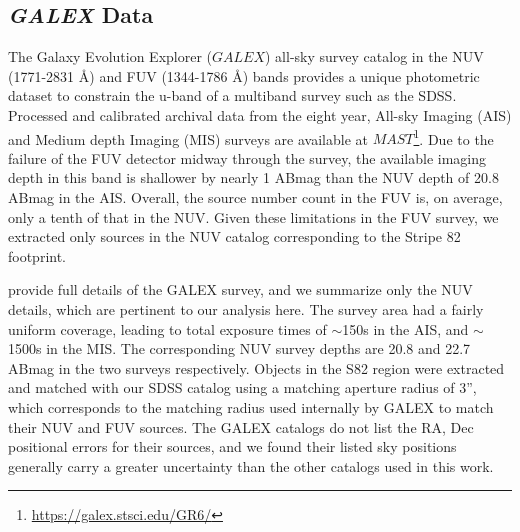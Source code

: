 \documentclass{aastex63}
\begin{document}
 



        

\subsection{{\it GALEX} Data} \label{ssec:galex}

The Galaxy Evolution Explorer ($GALEX$) all-sky survey catalog in the NUV (1771-2831 \AA) and FUV (1344-1786 \AA) bands provides a unique photometric dataset to constrain the u-band of a multiband survey such as the SDSS. Processed and calibrated archival data from the eight year, All-sky Imaging (AIS) and Medium depth Imaging (MIS) surveys are available at $MAST$\footnote{\url{https://galex.stsci.edu/GR6/}}. Due to the failure of the FUV detector midway through the survey, the available imaging depth in this band is shallower by nearly 1 ABmag than the NUV depth of 20.8 ABmag in the AIS. Overall, the source number count in the FUV is, on average, only a tenth of that in the NUV. Given these limitations in the FUV survey, we extracted only sources in the NUV catalog corresponding to the Stripe 82 footprint.  
 
\citet{2017ApJS..230...24B} provide full details of the GALEX survey, and we summarize only the NUV details, which are pertinent to our analysis here. The survey area had a fairly uniform coverage, leading to total exposure times of $\sim$150s in the AIS, and $\sim$1500s in the MIS. The corresponding NUV survey depths are 20.8 and 22.7 ABmag in the two surveys respectively. Objects in the S82 region were extracted and matched with our SDSS catalog using a matching aperture radius of 3'', which corresponds to the matching radius used internally by GALEX to match their NUV and FUV sources. The GALEX catalogs do not list the RA, Dec positional errors for their sources, and we found their listed sky positions generally carry a greater uncertainty than the other catalogs used in this work.
\end{document}
